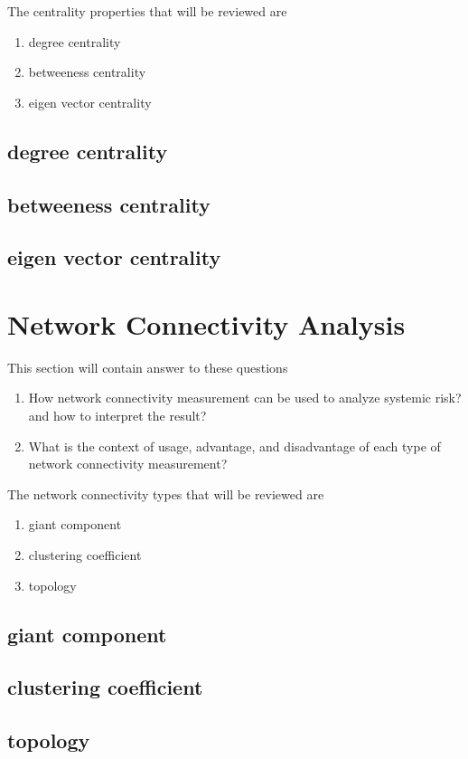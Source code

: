 \documentclass[a4paper,11pt]{article}
\begin{document}
The centrality properties that will be reviewed are
\begin{enumerate}
    \item degree centrality
    \item betweeness centrality
    \item eigen vector centrality
\end{enumerate}

\subsection{degree centrality}
\subsection{betweeness centrality}
\subsection{eigen vector centrality}


\section{Network Connectivity Analysis}
This section will contain answer to these questions
\begin{enumerate}
    \item How network connectivity measurement can be used to analyze systemic risk? and how to interpret the result?
    \item What is the context of usage, advantage, and disadvantage of each type of network connectivity measurement?
\end{enumerate}

The network connectivity types that will be reviewed are
\begin{enumerate}
    \item giant component 
    \item clustering coefficient 
    \item topology 
\end{enumerate}

\subsection{giant component}
\subsection{clustering coefficient}
\subsection{topology}
\end{document}
